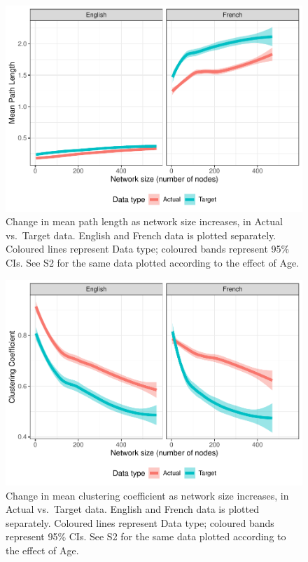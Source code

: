 \documentclass[
  man]{apa6}
\begin{document}
\begin{figure}
\centering
\includegraphics{NetworkGraphs_R1_files/figure-latex/Figure-path-length-DT-1.pdf}
\caption{\label{fig:Figure-path-length-DT}Change in mean path length as network size increases, in Actual vs.~Target data. English and French data is plotted separately. Coloured lines represent Data type; coloured bands represent 95\% CIs. See S2 for the same data plotted according to the effect of Age.}
\end{figure}

\begin{figure}
\centering
\includegraphics{NetworkGraphs_R1_files/figure-latex/Figure-clust-coef-DT-1.pdf}
\caption{\label{fig:Figure-clust-coef-DT}Change in mean clustering coefficient as network size increases, in Actual vs.~Target data. English and French data is plotted separately. Coloured lines represent Data type; coloured bands represent 95\% CIs. See S2 for the same data plotted according to the effect of Age.}
\end{figure}
\end{document}
